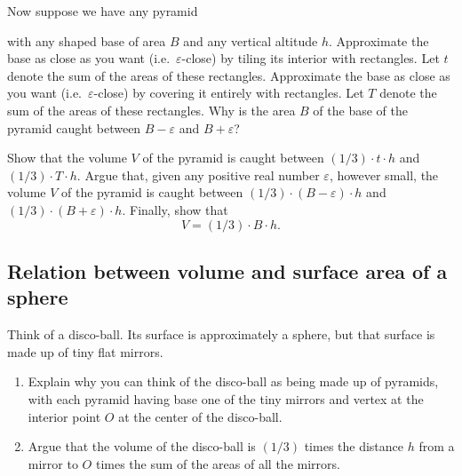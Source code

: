 \documentclass[newpage,hints,handout,noauthor,nooutcomes,12pt]{ximera}
\begin{document}
Now suppose we have any pyramid%
\begin{image}
\end{image}
with any shaped base of area $B$ and any vertical altitude $h$. Approximate
the base as close as you want (i.e.\ $\varepsilon$-close) by tiling its interior
with rectangles. Let $t$ denote the sum of the areas of these rectangles.
Approximate the base as close as you want (i.e.\ $\varepsilon$-close) by
covering it entirely with rectangles. Let $T$ denote the sum of the areas of
these rectangles. Why is the area $B$ of the base of the pyramid caught
between $B-\varepsilon$ and $B+\varepsilon$?

\begin{problem}
Show that the volume $V$ of the pyramid is caught between $\left(
1/3\right) \cdot t\cdot h$ and $\left( 1/3\right) \cdot T\cdot
h$. Argue that, given any positive real number $\varepsilon$, however
small, the volume $V$ of the pyramid is caught between $\left(
1/3\right) \cdot \left( B-\varepsilon\right)\cdot h$ and $\left(
1/3\right) \cdot \left( B+\varepsilon\right) \cdot h$. Finally, show that
\[
V=\left(  1/3\right)  \cdot B\cdot h.
\]
\end{problem}

\subsection{Relation between volume and surface area of a sphere}

Think of a disco-ball. Its surface is approximately a sphere, but that
surface is made up of tiny flat mirrors.

\begin{problem}\hfil
\begin{enumerate}
\item Explain why you can think of the disco-ball as being made up of
  pyramids, with each pyramid having base one of the tiny mirrors and
  vertex at the interior point $O$ at the center of the disco-ball.
\item Argue that the volume of the disco-ball is $\left( 1/3\right) $
  times the distance $h$ from a mirror to $O$ times the sum of the
  areas of all the mirrors.
\end{enumerate}
\end{problem}
\end{document}
